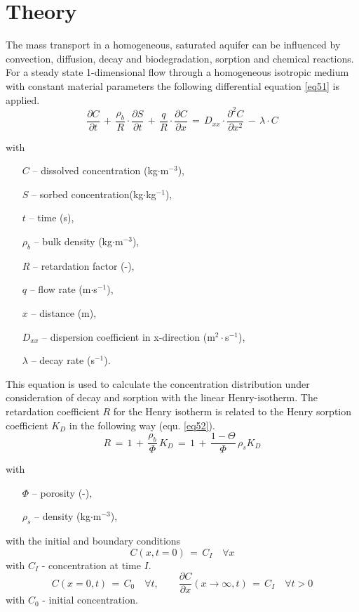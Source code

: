 \section{Theory}

The mass transport in a homogeneous, saturated aquifer can be influenced by convection, diffusion, decay and biodegradation, sorption and chemical reactions. For a steady state 1-dimensional flow through a homogeneous isotropic medium with constant material parameters the following differential equation \ref{eq51} is applied.
\begin{equation}
\frac{\partial C}{\partial t}\,+\, \frac{\rho_b}{R}\cdot\frac{\partial S}{\partial t}\,+\, \frac{q}{R}\cdot\frac{\partial C}{\partial x}\,=\,
D_{xx}\cdot\frac{\partial^2C}{\partial x^2}\,-\,\lambda\cdot C
\label{eq51}
\end{equation}
{\small
with
\begin{itemize}
\item[$C$] -- dissolved concentration (kg$\cdot$m$^{-3}$),
\item[$S$] -- sorbed concentration(kg$\cdot$kg$^{-1}$),
\item[$t$] -- time (s),
\item[$\rho_b$] -- bulk density (kg$\cdot$m$^{-3}$),
\item[$R$] -- retardation factor (-),
\item[$q$] -- flow rate (m$\cdot$s$^{-1}$),
\item[$x$] -- distance (m),
\item[$D_{xx}$] -- dispersion coefficient in x-direction (m$^2\cdot$s$^{-1}$),
\item[$\lambda$] -- decay rate (s$^{-1}$).
\end{itemize}
}

This equation is used to calculate the concentration distribution under consideration of decay and sorption with the linear Henry-isotherm. The retardation coefficient $R$ for the Henry isotherm is related to the Henry sorption coefficient $K_D$ in the following way (equ. \ref{eq52}).
\begin{equation}
R\,=\,1\,+\,\frac{\rho_b}{\Phi}\,K_D\,=\,
1\,+\,\frac{1-\Theta}{\Phi}\,\rho_s K_D
\label{eq52}
\end{equation}
{\small
with
\begin{itemize}
\item[$\Phi$] -- porosity (-),
\item[$\rho_s$] -- density (kg$\cdot$m$^{-3}$),
\end{itemize}
with the initial and boundary conditions
\begin{displaymath}
C(x,t=0)\,=\,C_I\quad\forall x
\end{displaymath}
with $C_I$ - concentration at time $I$.
\begin{displaymath}
C(x=0,t)\,=\,C_0\quad\forall t,\qquad
\frac{\partial C}{\partial x}(x\rightarrow\infty,t)\,=\,C_I
\quad\forall t>0
\end{displaymath}
with $C_0$ - initial concentration.
}

